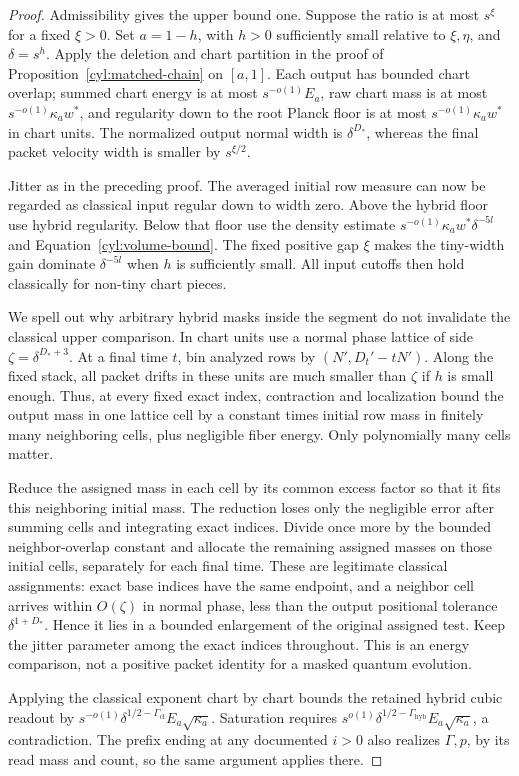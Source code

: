 \begin{proof}
Admissibility gives the upper bound one.  Suppose the ratio is at most
$s^\xi$ for a fixed $\xi>0$.  Set $a=1-h$, with $h>0$ sufficiently
small relative to $\xi,\eta$, and $\delta=s^h$.  Apply the deletion and
chart partition in the proof of Proposition~\ref{cyl:matched-chain}
on $[a,1]$.  Each output has bounded chart overlap; summed chart energy
is at most $s^{-o(1)}E_a$, raw chart mass is at most
$s^{-o(1)}\kappa_aw^*$, and regularity down to the root Planck floor
is at most $s^{-o(1)}\kappa_aw^*$ in chart units.  The normalized output
normal width is $\delta^{D_*}$, whereas the final packet velocity width
is smaller by $s^{\xi/2}$.

Jitter as in the preceding proof.  The averaged initial row measure
can now be regarded as classical input regular down to width zero.
Above the hybrid floor use hybrid regularity.  Below that floor use
the density estimate $s^{-o(1)}\kappa_aw^*\delta^{-5l}$ and
Equation~\eqref{cyl:volume-bound}.  The fixed positive gap $\xi$ makes
the tiny-width gain dominate $\delta^{-5l}$ when $h$ is sufficiently
small.  All input cutoffs then hold classically for non-tiny chart
pieces.

We spell out why arbitrary hybrid masks inside the segment do not
invalidate the classical upper comparison.  In chart units use a
normal phase lattice of side $\zeta=\delta^{D_*+3}$.  At a final time
$t$, bin analyzed rows by $(N',D_t'-tN')$.  Along the fixed stack, all
packet drifts in these units are much smaller than $\zeta$ if $h$ is
small enough.  Thus, at every fixed exact index, contraction and
localization bound the output mass in one lattice cell by a constant
times initial row mass in finitely many neighboring cells, plus
negligible fiber energy.  Only polynomially many cells matter.

Reduce the assigned mass in each cell by its common excess factor so
that it fits this neighboring initial mass.  The reduction loses only
the negligible error after summing cells and integrating exact indices.
Divide once more by the bounded neighbor-overlap constant and allocate
the remaining assigned masses on those initial cells, separately for
each final time.  These are legitimate classical assignments: exact
base indices have the same endpoint, and a neighbor cell arrives within
$O(\zeta)$ in normal phase, less than the output positional tolerance
$\delta^{1+D_*}$.  Hence it lies in a bounded enlargement of the
original assigned test.  Keep the jitter parameter among the exact
indices throughout.  This is an energy comparison, not a positive
packet identity for a masked quantum evolution.

Applying the classical exponent chart by chart bounds the retained
hybrid cubic readout by
$s^{-o(1)}\delta^{1/2-\Gamma_{\mathrm{cl}}}E_a\sqrt{\kappa_a}$.
Saturation requires
$s^{o(1)}\delta^{1/2-\Gamma_{\mathrm{hyb}}}E_a\sqrt{\kappa_a}$,
a contradiction.  The prefix ending at any documented $i>0$ also
realizes $\Gamma,p$, by its read mass and count, so the same argument
applies there.
\end{proof}

